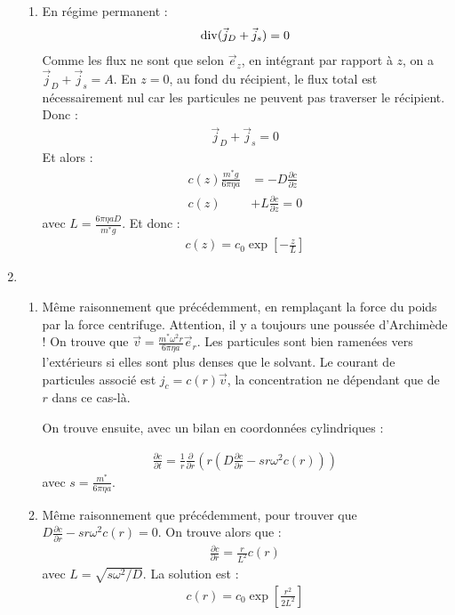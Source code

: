 \begin{correction}
\begin{enumerate}
\begin{enumerate}
	\item En régime permanent : 
	\begin{align*}
		\mathop{}\!\mathrm{div}(\vec{j}_D+\vec{j}_s)=0
	\end{align*}
	Comme les flux ne sont que selon $\vec{e}_z$, en intégrant par rapport à $z$, on a $\vec{j}_D+\vec{j}_s=A$. En $z=0$, au fond du récipient, le flux total est nécessairement nul car les particules ne peuvent pas traverser le récipient. Donc :
	\begin{align*}
		\vec{j}_D+\vec{j}_s=0
	\end{align*}
	Et alors :
	\begin{align*}
		c(z)\frac{m^*g}{6\pi\eta a} &= -D\frac{\partial c}{\partial z} \\
		c(z) &+ L\frac{\partial c}{\partial z}=0
	\end{align*}
	avec $L=\frac{6\pi\eta aD}{m^*g}$.
	Et donc :
	\begin{align*}
		c(z)=c_0\exp\left[-\frac{z}{L} \right] 
	\end{align*}
	
\end{enumerate}

\item

\begin{enumerate}

	\item Même raisonnement que précédemment, en remplaçant la force du poids par la force centrifuge. Attention, il y a toujours une poussée d'Archimède ! On trouve que $\vec{v}=\frac{m^*\omega^2 r}{6\pi\eta a}\vec{e}_r$. Les particules sont bien ramenées vers l'extérieurs si elles sont plus denses que le solvant. Le courant de particules associé est $j_c=c(r)\vec{v}$, la concentration ne dépendant que de $r$ dans ce cas-là.
	
	On trouve ensuite, avec un bilan en coordonnées cylindriques :

	\begin{align*}
		\frac{\partial c}{\partial t}=\frac{1}{r}\frac{\partial }{\partial r}\left(r\left(D\frac{\partial c}{\partial r} -sr\omega^2c(r) \right) \right)
	\end{align*}
	avec $s=\frac{m^*}{6\pi\eta a}$. 
	
	\item Même raisonnement que précédemment, pour trouver que $D\frac{\partial c}{\partial r} -sr\omega^2c(r)=0$.
	On trouve alors que :
	\begin{align*}
	 \frac{\partial c}{\partial r}=\frac{r}{L^2}c(r)
	\end{align*}
	avec $L=\sqrt{s\omega^2/D}$.
	La solution est :
	\begin{align*}
		c(r)=c_0\exp\left[\frac{r^2}{2L^2} \right] 
	\end{align*}

\end{enumerate}

\end{enumerate}

\end{correction}


